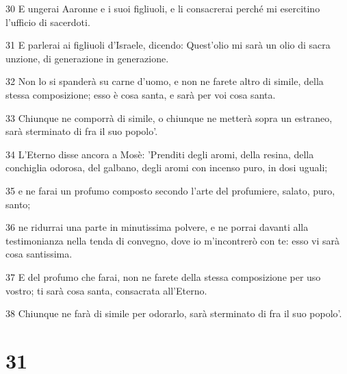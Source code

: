 \par 30 E ungerai Aaronne e i suoi figliuoli, e li consacrerai perché mi esercitino l'ufficio di sacerdoti.
\par 31 E parlerai ai figliuoli d'Israele, dicendo: Quest'olio mi sarà un olio di sacra unzione, di generazione in generazione.
\par 32 Non lo si spanderà su carne d'uomo, e non ne farete altro di simile, della stessa composizione; esso è cosa santa, e sarà per voi cosa santa.
\par 33 Chiunque ne comporrà di simile, o chiunque ne metterà sopra un estraneo, sarà sterminato di fra il suo popolo'.
\par 34 L'Eterno disse ancora a Mosè: 'Prenditi degli aromi, della resina, della conchiglia odorosa, del galbano, degli aromi con incenso puro, in dosi uguali;
\par 35 e ne farai un profumo composto secondo l'arte del profumiere, salato, puro, santo;
\par 36 ne ridurrai una parte in minutissima polvere, e ne porrai davanti alla testimonianza nella tenda di convegno, dove io m'incontrerò con te: esso vi sarà cosa santissima.
\par 37 E del profumo che farai, non ne farete della stessa composizione per uso vostro; ti sarà cosa santa, consacrata all'Eterno.
\par 38 Chiunque ne farà di simile per odorarlo, sarà sterminato di fra il suo popolo'.

\chapter{31}

